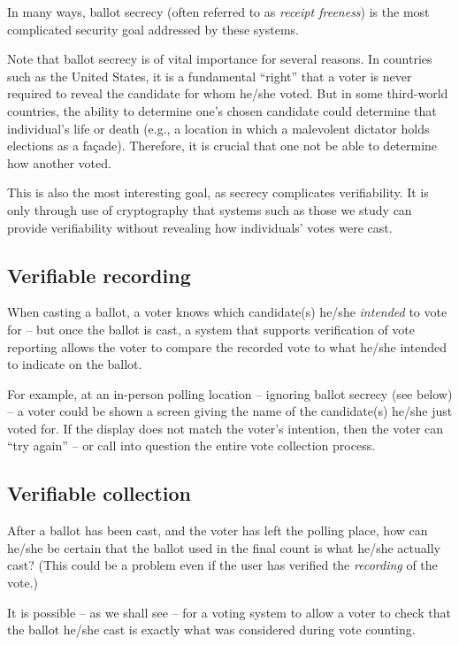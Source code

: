 \documentclass[10pt]{article}
\newcommand{\term}[1]{\textit{#1}}
\begin{document}
\begin{multicols}{2}
In many ways, ballot secrecy (often referred to as \term{receipt freeness}) is the most complicated security goal addressed by these systems.

Note that ballot secrecy is of vital importance for several reasons. In countries such as the United
States, it is a fundamental ``right'' that a voter is never required to reveal the candidate for
whom he/she voted. But in some third-world countries, the ability to determine one's chosen
candidate could determine that individual's life or death (e.g., a location in which a malevolent
dictator holds elections as a fa\c{c}ade). Therefore, it is crucial that one not be able to
determine how another voted.

This is also the most interesting goal, as secrecy complicates verifiability. It is only through use
of cryptography that systems such as those we study can provide verifiability without revealing how
individuals' votes were cast.

\subsection{Verifiable recording}

When casting a ballot, a voter knows which candidate(s) he/she \emph{intended} to vote for -- but
once the ballot is cast, a system that supports verification of vote reporting allows the voter to
compare the recorded vote to what he/she intended to indicate on the ballot.

For example, at an in-person polling location -- ignoring ballot secrecy (see below) -- a voter
could be shown a screen giving the name of the candidate(s) he/she just voted for. If the display
does not match the voter's intention, then the voter can ``try again'' -- or call into question the
entire vote collection process.

\subsection{Verifiable collection}

After a ballot has been cast, and the voter has left the polling place, how can he/she be certain
that the ballot used in the final count is what he/she actually cast? (This could be a problem even
if the user has verified the \emph{recording} of the vote.)

It is possible -- as we shall see -- for a voting system to allow a voter to check that the ballot
he/she cast is exactly what was considered during vote counting.


\end{multicols}
\end{document}
